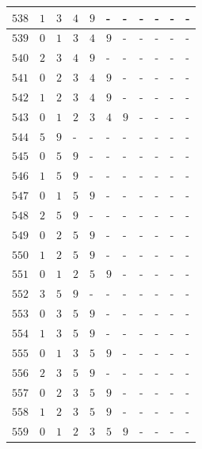 \begin{appendices}
\begin{table}[H]
\begin{tabular} {|l|l|l|l|l|l|l|l|l|l|l|}
  		$ 538 $ & $ 1 $ &$ 3 $ &$ 4 $ &$ 9 $ & - &  - &  - &  - &  - &  -   \\ \hline
  		$ 539 $ & $ 0 $ &$ 1 $ &$ 3 $ &$ 4 $ &$ 9 $ & - &  - &  - &  - &  -   \\ \hline
  		$ 540 $ & $ 2 $ &$ 3 $ &$ 4 $ &$ 9 $ & - &  - &  - &  - &  - &  -   \\ \hline
  		$ 541 $ & $ 0 $ &$ 2 $ &$ 3 $ &$ 4 $ &$ 9 $ & - &  - &  - &  - &  -   \\ \hline
  		$ 542 $ & $ 1 $ &$ 2 $ &$ 3 $ &$ 4 $ &$ 9 $ & - &  - &  - &  - &  -   \\ \hline
  		$ 543 $ & $ 0 $ &$ 1 $ &$ 2 $ &$ 3 $ &$ 4 $ &$ 9 $ & - &  - &  - &  -   \\ \hline
  		$ 544 $ & $ 5 $ &$ 9 $ & - &  - &  - &  - &  - &  - &  - &  -   \\ \hline
  		$ 545 $ & $ 0 $ &$ 5 $ &$ 9 $ & - &  - &  - &  - &  - &  - &  -   \\ \hline
  		$ 546 $ & $ 1 $ &$ 5 $ &$ 9 $ & - &  - &  - &  - &  - &  - &  -   \\ \hline
  		$ 547 $ & $ 0 $ &$ 1 $ &$ 5 $ &$ 9 $ & - &  - &  - &  - &  - &  -   \\ \hline
  		$ 548 $ & $ 2 $ &$ 5 $ &$ 9 $ & - &  - &  - &  - &  - &  - &  -   \\ \hline
  		$ 549 $ & $ 0 $ &$ 2 $ &$ 5 $ &$ 9 $ & - &  - &  - &  - &  - &  -   \\ \hline
  		$ 550 $ & $ 1 $ &$ 2 $ &$ 5 $ &$ 9 $ & - &  - &  - &  - &  - &  -   \\ \hline
  		$ 551 $ & $ 0 $ &$ 1 $ &$ 2 $ &$ 5 $ &$ 9 $ & - &  - &  - &  - &  -   \\ \hline
  		$ 552 $ & $ 3 $ &$ 5 $ &$ 9 $ & - &  - &  - &  - &  - &  - &  -   \\ \hline
  		$ 553 $ & $ 0 $ &$ 3 $ &$ 5 $ &$ 9 $ & - &  - &  - &  - &  - &  -   \\ \hline
  		$ 554 $ & $ 1 $ &$ 3 $ &$ 5 $ &$ 9 $ & - &  - &  - &  - &  - &  -   \\ \hline
  		$ 555 $ & $ 0 $ &$ 1 $ &$ 3 $ &$ 5 $ &$ 9 $ & - &  - &  - &  - &  -   \\ \hline
  		$ 556 $ & $ 2 $ &$ 3 $ &$ 5 $ &$ 9 $ & - &  - &  - &  - &  - &  -   \\ \hline
  		$ 557 $ & $ 0 $ &$ 2 $ &$ 3 $ &$ 5 $ &$ 9 $ & - &  - &  - &  - &  -   \\ \hline
  		$ 558 $ & $ 1 $ &$ 2 $ &$ 3 $ &$ 5 $ &$ 9 $ & - &  - &  - &  - &  -   \\ \hline
  		$ 559 $ & $ 0 $ &$ 1 $ &$ 2 $ &$ 3 $ &$ 5 $ &$ 9 $ & - &  - &  - &  -   \\ \hline

\end{tabular}
\end{table}
\end{appendices}
